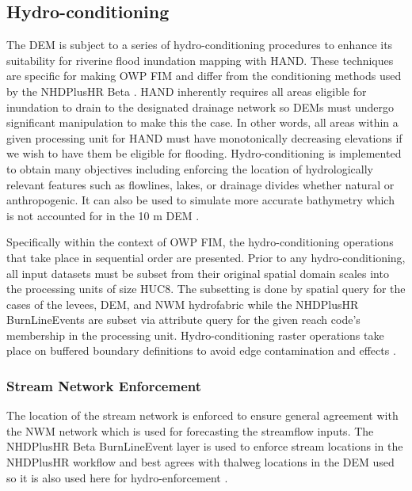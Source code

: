 \documentclass[draft]{dependencies/agujournal2019}
\begin{document}
\subsection{Hydro-conditioning}
\label{ssec:hydro_conditioning}
%
The DEM is subject to a series of hydro-conditioning procedures to enhance its suitability for riverine flood inundation mapping with HAND. 
These techniques are specific for making OWP FIM and differ from the conditioning methods used by the NHDPlusHR Beta \cite{moore2019user}.
HAND inherently requires all areas eligible for inundation to drain to the designated drainage network so DEMs must undergo significant manipulation to make this the case.
In other words, all areas within a given processing unit for HAND must have monotonically decreasing elevations if we wish to have them be eligible for flooding.
Hydro-conditioning is implemented to obtain many objectives including enforcing the location of hydrologically relevant features such as flowlines, lakes, or drainage divides whether natural or anthropogenic. 
It can also be used to simulate more accurate bathymetry which is not accounted for in the 10 m DEM \cite{gesch2002national}.

Specifically within the context of OWP FIM, the hydro-conditioning operations that take place in sequential order are presented. 
Prior to any hydro-conditioning, all input datasets must be subset from their original spatial domain scales into the processing units of size HUC8. 
The subsetting is done by spatial query for the cases of the levees, DEM, and NWM hydrofabric while the NHDPlusHR BurnLineEvents are subset via attribute query for the given reach code's membership in the processing unit.
Hydro-conditioning raster operations take place on buffered boundary definitions to avoid edge contamination and effects \cite{lindsay2013measuring}. 
%
\subsubsection{Stream Network Enforcement} 
\label{ssec:stream_network_enforcment}
%
The location of the stream network is enforced to ensure general agreement with the NWM network which is used for forecasting the streamflow inputs.
The NHDPlusHR Beta BurnLineEvent layer is used to enforce stream locations in the NHDPlusHR workflow and best agrees with thalweg locations in the DEM used so it is also used here for hydro-enforcement \cite{moore2019user}. 
\end{document}

